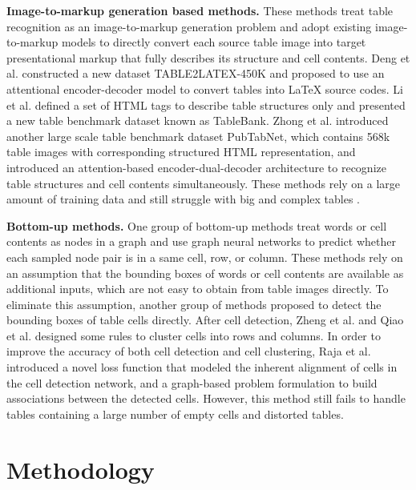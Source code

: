 \documentclass[final,3p,times,twocolumn]{elsarticle}
\begin{document}
\textbf{Image-to-markup generation based methods.} These methods treat table recognition as an image-to-markup generation problem and adopt existing image-to-markup models to directly convert each source table image into target presentational markup that fully describes its structure and cell contents. Deng et al. \cite{deng2019challenges} constructed a new dataset TABLE2LATEX-450K and proposed to use an attentional encoder-decoder model to convert tables into LaTeX source codes. Li et al. \cite{li2020tablebank} defined a set of HTML tags to describe table structures only and presented a new table benchmark dataset known as TableBank. Zhong et al. \cite{zhong2020image} introduced another large scale table benchmark dataset PubTabNet, which contains 568k table images with corresponding structured HTML representation, and introduced an attention-based encoder-dual-decoder architecture to recognize table structures and cell contents simultaneously. These methods rely on a large amount of training data and still struggle with big and complex tables \cite{zhong2020image,li2020tablebank}.

\textbf{Bottom-up methods.} One group of bottom-up methods \cite{qasim2019rethinking,chi2019complicated,li2021gfte,xue2019res2tim} treat words or cell contents as nodes in a graph and use graph neural networks to predict whether each sampled node pair is in a same cell, row, or column. These methods rely on an assumption that the bounding boxes of words or cell contents are available as additional inputs, which are not easy to obtain from table images directly. To eliminate this assumption, another group of methods \cite{zheng2021global,raja2020table,qiao2021lgpma} proposed to detect the bounding boxes of table cells directly. After cell detection, Zheng et al. \cite{zheng2021global} and Qiao et al. \cite{qiao2021lgpma} designed some rules to cluster cells into rows and columns. In order to improve the accuracy of both cell detection and cell clustering, Raja et al. \cite{raja2020table} introduced a novel loss function that modeled the inherent alignment of cells in the cell detection network, and a graph-based problem formulation to build associations between the detected cells. However, this method still fails to handle tables containing a large number of empty cells and distorted tables.

\section{Methodology}
\label{sec:methodology}
\end{document}
